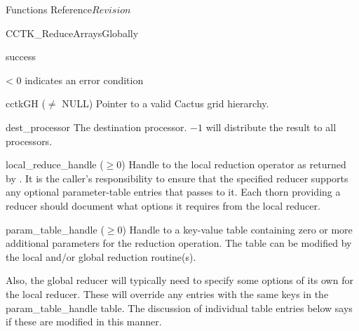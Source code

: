 \begin{cactuspart}{ Functions Reference}{}{$Revision$}
\begin{FunctionDescription}{CCTK\_ReduceArraysGlobally}
\begin{ResultSection}
\begin{Result}{0} success \end{Result}
\begin{Result}{< 0} indicates an error condition \end{Result}
\end{ResultSection}

\begin{ParameterSection}
\begin{Parameter}{cctkGH ($\ne$ NULL)}
Pointer to a valid Cactus grid hierarchy.
\end{Parameter}
\begin{Parameter}{dest\_processor}
The destination processor. $-1$ will distribute the result to all processors.
\end{Parameter}
\begin{Parameter}{local\_reduce\_handle ($\ge 0$)}
Handle to the local reduction operator as returned by \newline
{}. It is the caller's responsibility
to ensure that the specified reducer supports any optional
parameter-table entries that \newline {} passes to it.
Each thorn providing a \newline {} reducer should
document what options it requires from the local reducer.
\end{Parameter}
\begin{Parameter}{param\_table\_handle ($\ge 0$)}
Handle to a key-value table containing zero or more additional parameters
for the reduction operation. The table can be modified by the local
and/or global reduction routine(s).

Also, the global reducer will typically need to specify some options
of its own for the local reducer.  These will override any entries
with the same keys in the  param\_table\_handle  table.  The discussion
of individual table entries below says if these are modified in this
manner.


\end{Parameter}
\end{ParameterSection}
\end{FunctionDescription}
\end{cactuspart}
